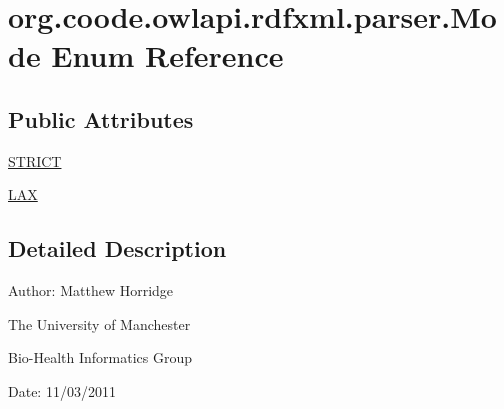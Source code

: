 \hypertarget{enumorg_1_1coode_1_1owlapi_1_1rdfxml_1_1parser_1_1_mode}{\section{org.\-coode.\-owlapi.\-rdfxml.\-parser.\-Mode Enum Reference}
\label{enumorg_1_1coode_1_1owlapi_1_1rdfxml_1_1parser_1_1_mode}
}
\subsection*{Public Attributes}
\begin{DoxyCompactItemize}
\item 
\hyperlink{enumorg_1_1coode_1_1owlapi_1_1rdfxml_1_1parser_1_1_mode_a75df5b7dc7c6b9f85985801a3a4854e3}{S\-T\-R\-I\-C\-T}
\item 
\hyperlink{enumorg_1_1coode_1_1owlapi_1_1rdfxml_1_1parser_1_1_mode_ab7b87a227b05c2b4ff7d449eaf95a06b}{L\-A\-X}
\end{DoxyCompactItemize}


\subsection{Detailed Description}
Author\-: Matthew Horridge\par
 The University of Manchester\par
 Bio-\/\-Health Informatics Group\par
 Date\-: 11/03/2011 

